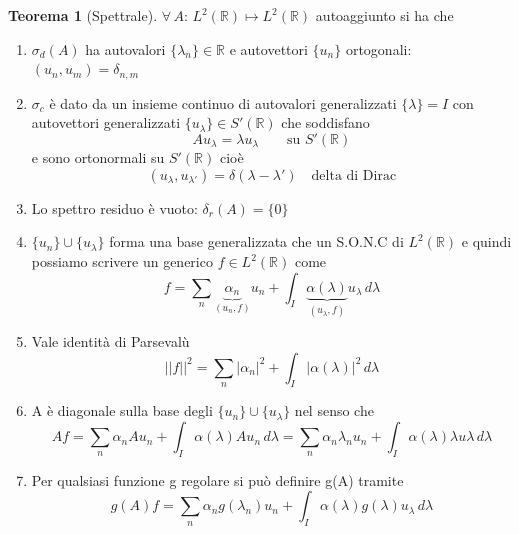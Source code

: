 \documentclass[a4paper,11pt]{report}
\theoremstyle{remark}
\theoremstyle{definition}
\newtheorem*{teo}{Teorema}
\newcommand{\R}{\mathbb{R}}
\begin{document}
\begin{teo}[Spettrale]
	$\forall \, A: \, L^2(\R) \mapsto L^2(\R)$ autoaggiunto si ha che
	\begin{enumerate}
		\item $\sigma_d(A)$ ha autovalori $\{\lambda_n\} \in \R$ e autovettori $\{u_n\}$ ortogonali: $(u_n,u_m) = \delta_{n,m}$
		\item $\sigma_c$ è dato da un insieme continuo di autovalori generalizzati $\{\lambda\} = I$ con autovettori generalizzati $\{u_\lambda\} \in S'(\R)$ che soddisfano
		\begin{equation*}
			Au_\lambda = \lambda u_\lambda \qquad \text{su } S'(\R)
		\end{equation*}
		e sono ortonormali su $S'(\R)$ cioè
		\begin{equation*}
			(u_\lambda, u_{\lambda'}) = \delta(\lambda- \lambda') \quad \text{delta di Dirac}
		\end{equation*}
		\item Lo spettro residuo è vuoto: $\delta_r(A) = \{0\}$
		\item $\{u_n\} \cup \{u_\lambda\}$ forma una base generalizzata che un S.O.N.C di $L^2(\R)$ e quindi possiamo scrivere un generico $f\in L^2(\R)$ come 
		\begin{equation*}
			f = \sum_n \underbrace{\alpha_n}_{(u_n,f)}u_n + \int_I \underbrace{\alpha(\lambda)}_{(u_\lambda,f)}u_\lambda \, d\lambda
		\end{equation*}
		\item Vale identità di Parsevalù
		\begin{equation*}
			{||f||}^2 = \sum_n {|\alpha_n|}^2 + \int_I {|\alpha(\lambda)|}^2 \, d\lambda
		\end{equation*}
		\item A è diagonale sulla base degli $\{u_n\} \cup \{u_\lambda\}$ nel senso che 
		\begin{equation*}
			Af = \sum_n \alpha_n A u_n + \int_I \alpha(\lambda) A u_n \, d\lambda = \sum_n \alpha_n \lambda_n u_n + \int_I \alpha(\lambda) \lambda u\lambda \, d\lambda 
		\end{equation*}
		\item Per qualsiasi funzione g regolare si può definire g(A) tramite
		\begin{equation*}
			g(A)f = \sum_n \alpha_n g(\lambda_n)u_n + \int_I \alpha(\lambda)g(\lambda)u_\lambda \, d\lambda
		\end{equation*}
		\end{enumerate}
\end{teo}
\end{document}
